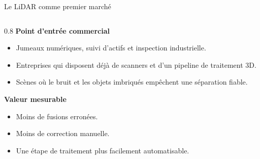 \documentclass[A4,svgnames,10pt,aspectratio=169,usepdftitle=false]{beamer}
\begin{document}
\begin{frame}{Le LiDAR comme premier marché}
    \begin{columns}[T,onlytextwidth]
        \begin{column}{0.8\textwidth}
            \textbf{\bleu Point d'entrée commercial}
            \begin{itemize}
                \item Jumeaux numériques, suivi d'actifs et inspection industrielle.
                \item Entreprises qui disposent déjà de scanners et d'un pipeline de traitement 3D.
                \item Scènes où le bruit et les objets imbriqués empêchent une séparation fiable.
            \end{itemize}

            \vspace{0.2cm}
            \textbf{\bleu Valeur mesurable}
            \begin{itemize}
                \item Moins de fusions erronées.
                \item Moins de correction manuelle.
                \item Une étape de traitement plus facilement automatisable.
            \end{itemize}
        \end{column}
    \end{columns}
\end{frame}
\end{document}
